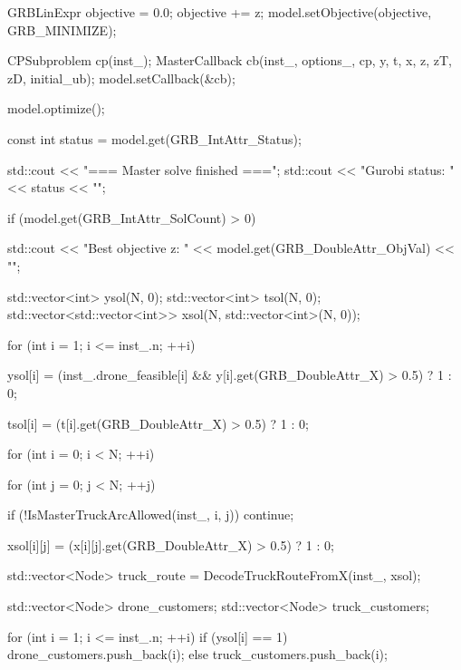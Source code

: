 {{{            GRBLinExpr objective = 0.0;
            objective += z;
            model.setObjective(objective, GRB_MINIMIZE);

            CPSubproblem cp(inst_);
            MasterCallback cb(inst_, options_, cp, y, t, x, z, zT, zD, initial_ub);
            model.setCallback(&cb);

            model.optimize();

            const int status = model.get(GRB_IntAttr_Status);

            std::cout << "\n=== Master solve finished ===\n";
            std::cout << "Gurobi status: " << status << "\n";

            if (model.get(GRB_IntAttr_SolCount) > 0)
            {
                std::cout << "Best objective z: "
                          << model.get(GRB_DoubleAttr_ObjVal)
                          << "\n";

                std::vector<int> ysol(N, 0);
                std::vector<int> tsol(N, 0);
                std::vector<std::vector<int>> xsol(N, std::vector<int>(N, 0));

                for (int i = 1; i <= inst_.n; ++i)
                {
                    ysol[i] = (inst_.drone_feasible[i] &&
                               y[i].get(GRB_DoubleAttr_X) > 0.5)
                                  ? 1
                                  : 0;

                    tsol[i] = (t[i].get(GRB_DoubleAttr_X) > 0.5) ? 1 : 0;
                }

                for (int i = 0; i < N; ++i)
                {
                    for (int j = 0; j < N; ++j)
                    {
                        if (!IsMasterTruckArcAllowed(inst_, i, j))
                            continue;

                        xsol[i][j] = (x[i][j].get(GRB_DoubleAttr_X) > 0.5) ? 1 : 0;
                    }
                }

                std::vector<Node> truck_route = DecodeTruckRouteFromX(inst_, xsol);

                std::vector<Node> drone_customers;
                std::vector<Node> truck_customers;

                for (int i = 1; i <= inst_.n; ++i)
                {
                    if (ysol[i] == 1)
                    {
                        drone_customers.push_back(i);
                    }
                    else
                    {
                        truck_customers.push_back(i);
                    }
                }

}}}}
